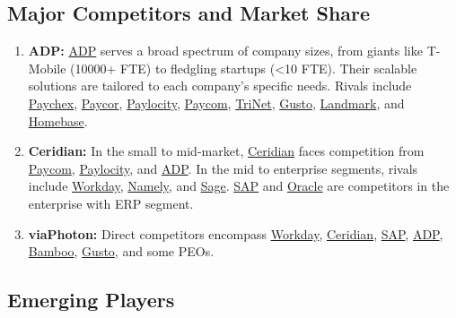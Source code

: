\documentclass[
  a4paper,
]{book}
\renewcommand{\labelenumi}{\textbf{\textcolor{com-color}{\arabic*.}}}%
\begin{document}
\hypertarget{major-competitors-and-market-share}{%
\subsection{Major Competitors and Market
Share}\label{major-competitors-and-market-share}}

\begin{enumerate}
\def\labelenumi{\arabic{enumi}.}
\item
  \textbf{ADP:} \href{https://www.adp.com/}{ADP} serves a broad spectrum
  of company sizes, from giants like T-Mobile (10000+ FTE) to fledgling
  startups (\textless10 FTE). Their scalable solutions are tailored to
  each company's specific needs. Rivals include
  \href{https://www.paychex.com/}{Paychex},
  \href{https://www.paycor.com/}{Paycor},
  \href{https://www.paylocity.com/}{Paylocity},
  \href{https://www.paycom.com/}{Paycom},
  \href{https://www.trinet.com/}{TriNet},
  \href{https://gusto.com/}{Gusto},
  \href{https://www.landmarkpayroll.com/}{Landmark}, and
  \href{https://www.joinhomebase.com/}{Homebase}.
\item
  \textbf{Ceridian:} In the small to mid-market,
  \href{https://www.ceridian.com/}{Ceridian} faces competition from
  \href{https://www.paycom.com/}{Paycom},
  \href{https://www.paylocity.com/}{Paylocity}, and
  \href{https://www.adp.com/}{ADP}. In the mid to enterprise segments,
  rivals include \href{https://www.workday.com/}{Workday},
  \href{https://www.namely.com/}{Namely}, and
  \href{https://www.sage.com/}{Sage}. \href{https://www.sap.com/}{SAP}
  and \href{https://www.oracle.com/}{Oracle} are competitors in the
  enterprise with ERP segment.
\item
  \textbf{viaPhoton:} Direct competitors encompass
  \href{https://www.workday.com/}{Workday},
  \href{https://www.ceridian.com/}{Ceridian},
  \href{https://www.sap.com/}{SAP}, \href{https://www.adp.com/}{ADP},
  \href{https://www.bamboohr.com/}{Bamboo},
  \href{https://gusto.com/}{Gusto}, and some PEOs.
\end{enumerate}

\hypertarget{emerging-players}{%
\subsection{Emerging Players}\label{emerging-players}}
\end{document}
